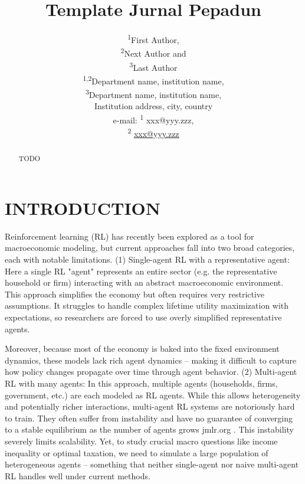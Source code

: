 \documentclass[11pt]{article}
\title{Template Jurnal Pepadun}
\author{%
    \begin{tabular}{c}
        \textsuperscript{1}First Author, \\
        \textsuperscript{2}Next Author and \\
        \textsuperscript{3}Last Author \\[6pt]
        \textsuperscript{1,2}Department name, institution name, \\
        \textsuperscript{3}Department name, institution name, \\ 
        Institution address, city, country \\[6pt]
        e-mail: \textsuperscript{1} xxx@yyy.zzz, \\
        \textsuperscript{2} \href{mailto:xxx@yyy.zzz}{\uline{xxx@yyy.zzz}}
    \end{tabular}%
}
\date{} %
\begin{document}
\maketitle

\begin{abstract}
TODO
\end{abstract}


\section{INTRODUCTION}

Reinforcement learning (RL) has recently been explored as a tool for macroeconomic modeling, but current approaches fall into two broad categories, each with notable limitations. (1) Single-agent RL with a representative agent: Here a single RL "agent" represents an entire sector (e.g. the representative household or firm) interacting with an abstract macroeconomic environment. This approach simplifies the economy but often requires very restrictive assumptions. It struggles to handle complex lifetime utility maximization with expectations, so researchers are forced to use overly simplified representative agents.

Moreover, because most of the economy is baked into the fixed environment dynamics, these models lack rich agent dynamics – making it difficult to capture how policy changes propagate over time through agent behavior. (2) Multi-agent RL with many agents: In this approach, multiple agents (households, firms, government, etc.) are each modeled as RL agents. While this allows heterogeneity and potentially richer interactions, multi-agent RL systems are notoriously hard to train. They often suffer from instability and have no guarantee of converging to a stable equilibrium as the number of agents grows
jmlr.org
. This instability severely limits scalability. Yet, to study crucial macro questions like income inequality or optimal taxation, we need to simulate a large population of heterogeneous agents – something that neither single-agent nor naive multi-agent RL handles well under current methods.
\end{document}
